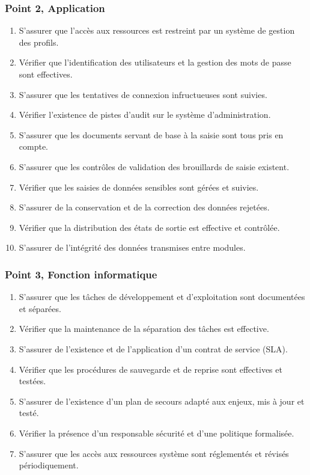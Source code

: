 \subsubsection{Point 2, Application}

\begin{enumerate}[label=2.\arabic*.]
    \item S'assurer que l'accès aux ressources est restreint par un système de gestion des profils.
    \item Vérifier que l'identification des utilisateurs et la gestion des mots de passe sont effectives.
    \item S'assurer que les tentatives de connexion infructueuses sont suivies.
    \item Vérifier l'existence de pistes d'audit sur le système d'administration.
    \item S'assurer que les documents servant de base à la saisie sont tous pris en compte.
    \item S'assurer que les contrôles de validation des brouillards de saisie existent.
    \item Vérifier que les saisies de données sensibles sont gérées et suivies.
    \item S'assurer de la conservation et de la correction des données rejetées.
    \item Vérifier que la distribution des états de sortie est effective et contrôlée.
    \item S'assurer de l'intégrité des données transmises entre modules.
\end{enumerate}

\subsubsection{Point 3, Fonction informatique}

\begin{enumerate}[label=3.\arabic*.]
    \item S'assurer que les tâches de développement et d'exploitation sont documentées et séparées.
    \item Vérifier que la maintenance de la séparation des tâches est effective.
    \item S'assurer de l'existence et de l'application d'un contrat de service (SLA).
    \item Vérifier que les procédures de sauvegarde et de reprise sont effectives et testées.
    \item S'assurer de l'existence d'un plan de secours adapté aux enjeux, mis à jour et testé.
    \item Vérifier la présence d'un responsable sécurité et d'une politique formalisée.
    \item S'assurer que les accès aux ressources système sont réglementés et révisés périodiquement.
\end{enumerate}

